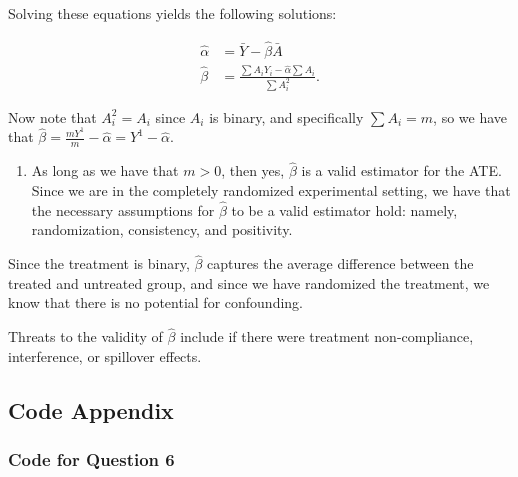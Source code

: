 \documentclass[
  letterpaper,
  DIV=11,
  numbers=noendperiod]{scrartcl}
\providecommand{\tightlist}{%
  \setlength{\itemsep}{0pt}\setlength{\parskip}{0pt}}\usepackage{longtable,booktabs,array}
\begin{document}
Solving these equations yields the following solutions:

\[
\begin{aligned}
\hat{\alpha} & = \bar{Y} - \hat{\beta} \bar{A} \\
\hat{\beta} & = \frac{\sum A_i Y_i - \hat \alpha \sum A_i }{\sum A_i^2}.
\end{aligned}
\]

Now note that \(A_i^2 = A_i\) since \(A_i\) is binary, and specifically
\(\sum A_i = m\), so we have that
\(\hat \beta = \frac{m Y^1}{m} - \hat \alpha = Y^1 - \hat \alpha\).

\begin{enumerate}
\def\labelenumi{\alph{enumi})}
\setcounter{enumi}{1}
\tightlist
\item
  As long as we have that \(m > 0\), then yes, \(\hat \beta\) is a valid
  estimator for the ATE. Since we are in the completely randomized
  experimental setting, we have that the necessary assumptions for
  \(\hat \beta\) to be a valid estimator hold: namely, randomization,
  consistency, and positivity.
\end{enumerate}

Since the treatment is binary, \(\hat \beta\) captures the average
difference between the treated and untreated group, and since we have
randomized the treatment, we know that there is no potential for
confounding.

Threats to the validity of \(\hat \beta\) include if there were
treatment non-compliance, interference, or spillover effects.

\newpage

\hypertarget{code-appendix}{%
\subsection{Code Appendix}\label{code-appendix}}

\hypertarget{code-for-question-6}{%
\subsubsection{Code for Question 6}\label{code-for-question-6}}
\end{document}
